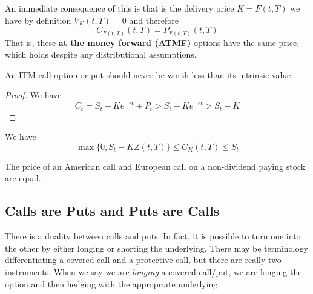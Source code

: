\documentclass{article}
\begin{document}
    An immediate consequence of this is that is the delivery price $K = F(t, T)$ we have by definition $V_K (t, T) = 0$ and therefore 
    \begin{equation}
      C_{F(t, T)} (t, T) = P_{F(t, T)} (t, T)
    \end{equation}
    That is, these \textbf{at the money forward (ATMF)} options have the same price, which holds despite any distributional assumptions. 

    \begin{theorem}
      An ITM call option or put should never be worth less than its intrinsic value. 
    \end{theorem}
    \begin{proof}
      We have 
      \begin{equation}
        C_t = S_t - K e^{-rt} + P_t > S_t - K e^{-r t} > S_t - K
      \end{equation}
    \end{proof}


    \begin{theorem}
      We have 
      \begin{equation}
        \max\{0, S_t - K Z(t, T)\} \leq C_K (t, T) \leq S_t
      \end{equation}
    \end{theorem}

    \begin{corollary}
      The price of an American call and European call on a non-dividend paying stock are equal. 
    \end{corollary}

  \subsection{Calls are Puts and Puts are Calls}

    There is a duality between calls and puts. In fact, it is possible to turn one into the other by either longing or shorting the underlying. There may be terminology differentiating a covered call and a protective call, but there are really two instruments. When we say we are \textit{longing} a covered call/put, we are longing the option and then hedging with the appropriate underlying. 
\end{document}
